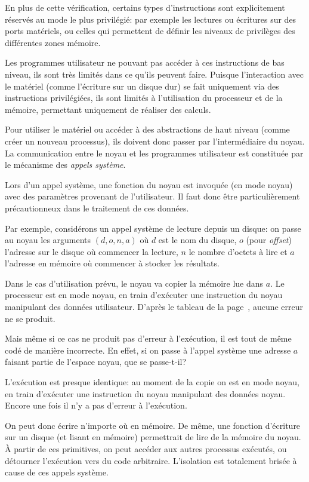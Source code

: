 En plus de cette vérification, certains types d'instructions sont explicitement
réservés au mode le plus privilégié: par exemple les lectures ou écritures sur
des ports matériels, ou celles qui permettent de définir les niveaux de
privilèges des différentes zones mémoire.

Les programmes utilisateur ne pouvant pas accéder à ces instructions de bas
niveau, ils sont très limités dans ce qu'ils peuvent faire. Puisque
l'interaction avec le matériel (comme l'écriture sur un disque dur) se fait
uniquement via des instructions privilégiées, ils sont limités à l'utilisation
du processeur et de la mémoire, permettant uniquement de réaliser des calculs.

Pour utiliser le matériel ou accéder à des abstractions de haut niveau (comme
créer un nouveau processus), ils doivent donc passer par l'intermédiaire du
noyau. La communication entre le noyau et les programmes utilisateur est
constituée par le mécanisme des \emph{appels système}.

Lors d'un appel système, une fonction du noyau est invoquée (en mode noyau) avec
des paramètres provenant de l'utilisateur. Il faut donc être particulièrement
précautionneux dans le traitement de ces données.

Par exemple, considérons un appel système de lecture depuis un disque: on passe
au noyau les arguments $(d, o, n, a)$ où $d$ est le nom du disque, $o$ (pour
\emph{offset}) l'adresse sur le disque où commencer la lecture, $n$ le nombre
d'octets à lire et $a$ l'adresse en mémoire où commencer à stocker les
résultats.

Dans le cas d'utilisation prévu, le noyau va copier la mémoire lue dans $a$. Le
processeur est en mode noyau, en train d'exécuter une instruction du noyau
manipulant des données utilisateur. D'après le tableau de la
page~\pageref{page:erreursec}, aucune erreur ne se produit.

Mais même si ce cas ne produit pas d'erreur à l'exécution, il est tout de même
codé de manière incorrecte. En effet, si on passe à l'appel système une adresse
$a$ faisant partie de l'espace noyau, que se passe-t-il?

L'exécution est presque identique: au moment de la copie on est en mode noyau,
en train d'exécuter une instruction du noyau manipulant des données noyau.
Encore une fois il n'y a pas d'erreur à l'exécution.

On peut donc écrire n'importe où en mémoire. De même, une fonction d'écriture
sur un disque (et lisant en mémoire) permettrait de lire de la mémoire du noyau.
À partir de ces primitives, on peut accéder aux autres processus exécutés, ou
détourner l'exécution vers du code arbitraire. L'isolation est totalement
brisée à cause de ces appels système.

